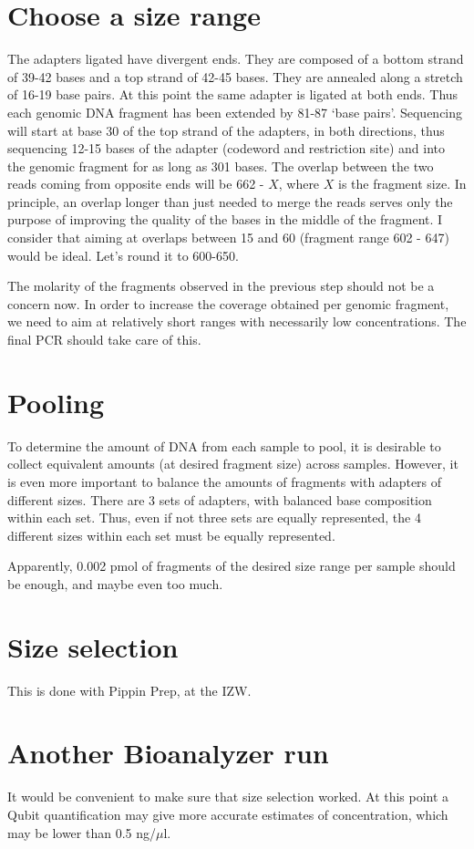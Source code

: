 \documentclass[a4paper,12pt]{article}
\begin{document}
\section{Choose a size range}
The adapters ligated have divergent ends. They are composed of a bottom strand of 39-42 bases and a top strand of 42-45 bases. They are annealed along a stretch of 16-19 base pairs. At this point the same adapter is ligated at both ends. Thus each genomic DNA fragment has been extended by 81-87 `base pairs'. Sequencing will start at base 30 of the top strand of the adapters, in both directions, thus sequencing 12-15 bases of the adapter (codeword and restriction site) and into the genomic fragment for as long as 301 bases. The overlap between the two reads coming from opposite ends will be 662 - $X$, where $X$ is the fragment size. In principle, an overlap longer than just needed to merge the reads serves only the purpose of improving the quality of the bases in the middle of the fragment. I consider that aiming at overlaps between 15 and 60 (fragment range 602 - 647) would be ideal. Let's round it to 600-650.

The molarity of the fragments observed in the previous step should not be a concern now. In order to increase the coverage obtained per genomic fragment, we need to aim at relatively short ranges with necessarily low concentrations. The final PCR should take care of this.

\section{Pooling}
To determine the amount of DNA from each sample to pool, it is desirable to collect equivalent amounts (at desired fragment size) across samples. However, it is even more important to balance the amounts of fragments with adapters of different sizes. There are 3 sets of adapters, with balanced base composition within each set. Thus, even if not three sets are equally represented, the 4 different sizes within each set must be equally represented.

Apparently, 0.002 pmol of fragments of the desired size range per sample should be enough, and maybe even too much.

\section{Size selection}
This is done with Pippin Prep, at the IZW.

\section{Another Bioanalyzer run}
It would be convenient to make sure that size selection worked. At this point a Qubit quantification may give more accurate estimates of concentration, which may be lower than 0.5 ng/$\mu$l.
\end{document}
